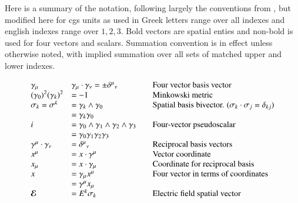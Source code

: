 \documentclass{article}
\newcommand{\EE}[0]{\boldsymbol{\mathcal{E}}}
\begin{document}
% 
%
Here is a summary of the notation, following largely the conventions from
\cite{doran2003gap}, but modified here for cgs units as used in \cite{bohm1989qt}
Greek letters range over all indexes and
english indexes range over $1,2,3$.  Bold vectors are spatial enties and non-bold is used for four vectors and scalars.
Summation convention is in effect unless otherwise noted, with implied summation over all sets of matched upper and lower indexes.

\begin{equation*}\label{eqn:notation}
\begin{array}{l l l}
\gamma_{\mu} & \gamma_{\mu} \cdot \gamma_{\nu} = \pm {\delta^{\mu}}_{\nu} & \quad \mbox{Four vector basis vector} \\
{(\gamma_0)}^2 {(\gamma_k)}^2 &= -1 & \quad \mbox{Minkowski metric} \\
\sigma_k = \sigma^k &= \gamma_{k} \wedge \gamma_0 & \quad \mbox{Spatial basis bivector. ($\sigma_k \cdot \sigma_j = \delta_{kj}$)} \\
                    &= \gamma_{k} \gamma_0 & \\
i &= \gamma_{0} \wedge \gamma_1 \wedge \gamma_{2} \wedge \gamma_3 & \quad \mbox{Four-vector pseudoscalar} \\
  &= \gamma_{0} \gamma_1 \gamma_{2} \gamma_3 & \\
\gamma^{\mu} \cdot \gamma_{\nu} &= {\delta^{\mu}}_{\nu} & \quad \mbox{Reciprocal basis vectors} \\
x^{\mu} &= x \cdot \gamma^{\mu} & \quad \mbox{Vector coordinate} \\
x_{\mu} &= x \cdot \gamma_{\mu} & \quad \mbox{Coordinate for reciprocal basis} \\
x &= \gamma_{\mu} x^{\mu} & \quad \mbox{Four vector in terms of coordinates} \\
  &= \gamma^{\mu} x_{\mu} \\
\EE &= E^k \sigma_k & \quad \mbox{Electric field spatial vector} \\

\end{array}
\end{equation*}
\end{document}
